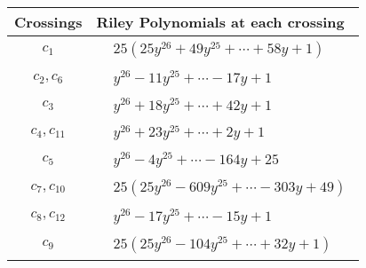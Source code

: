 \documentclass[1p]{elsarticle_modified}
\theoremstyle{definition}
\begin{document}
\begin{tabular}{m{50pt}|m{274pt}}
Crossings & \hspace{64pt}Riley Polynomials at each crossing \\
\hline $$\begin{aligned}c_{1}\end{aligned}$$&$\begin{aligned}
&25(25 y^{26}+49 y^{25}+\cdots+58 y+1)
\end{aligned}$\\
\hline $$\begin{aligned}c_{2},c_{6}\end{aligned}$$&$\begin{aligned}
&y^{26}-11 y^{25}+\cdots-17 y+1
\end{aligned}$\\
\hline $$\begin{aligned}c_{3}\end{aligned}$$&$\begin{aligned}
&y^{26}+18 y^{25}+\cdots+42 y+1
\end{aligned}$\\
\hline $$\begin{aligned}c_{4},c_{11}\end{aligned}$$&$\begin{aligned}
&y^{26}+23 y^{25}+\cdots+2 y+1
\end{aligned}$\\
\hline $$\begin{aligned}c_{5}\end{aligned}$$&$\begin{aligned}
&y^{26}-4 y^{25}+\cdots-164 y+25
\end{aligned}$\\
\hline $$\begin{aligned}c_{7},c_{10}\end{aligned}$$&$\begin{aligned}
&25(25 y^{26}-609 y^{25}+\cdots-303 y+49)
\end{aligned}$\\
\hline $$\begin{aligned}c_{8},c_{12}\end{aligned}$$&$\begin{aligned}
&y^{26}-17 y^{25}+\cdots-15 y+1
\end{aligned}$\\
\hline $$\begin{aligned}c_{9}\end{aligned}$$&$\begin{aligned}
&25(25 y^{26}-104 y^{25}+\cdots+32 y+1)
\end{aligned}$\\
\hline
\end{tabular}\\~\\
\end{document}
